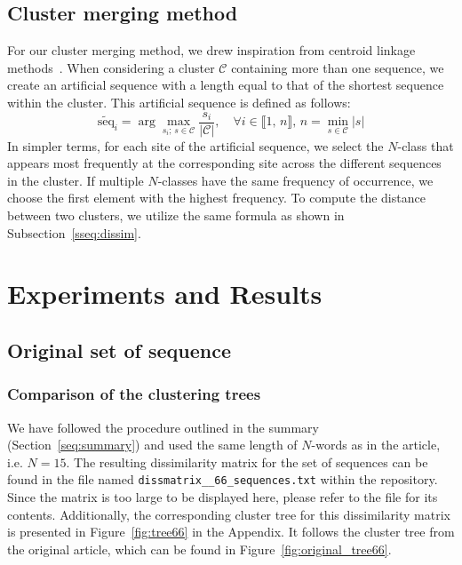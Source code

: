 \documentclass[english,13pt,a4paper]{article}
\theoremstyle{definition}
\theoremstyle{remark}
\theoremstyle{defstyle}
\begin{document}
\subsection{Cluster merging method}\label{ssec:merge}

For our cluster merging method, we drew inspiration from centroid linkage methods~\cite{duda1973pattern}. When considering a cluster $\mathcal{C}$ containing more than one sequence, we create an artificial sequence with a length equal to that of the shortest sequence within the cluster. This artificial sequence is defined as follows:
\[
    \widetilde{\text{seq}}_i = \arg \max_{s_i; \,s \in \mathcal C} \frac{s_i}{|\mathcal C|},  \quad \forall i \in \llbracket 1, \, n \rrbracket, \, n = \min_{s \in \mathcal{C}} |s| 
\]
In simpler terms, for each site of the artificial sequence, we select the $N$-class that appears most frequently at the corresponding site across the different sequences in the cluster. If multiple $N$-classes have the same frequency of occurrence, we choose the first element with the highest frequency. To compute the distance between two clusters, we utilize the same formula as shown in Subsection~\ref{sseq:dissim}. 



\section{Experiments and Results}

\subsection{Original set of sequence}

\subsubsection{Comparison of the clustering trees}

We have followed the procedure outlined in the summary (Section~\ref{seq:summary}) and used the same length of $N$-words as in the article, i.e. $N=15$. The resulting dissimilarity matrix for the set of sequences can be found in the file named \texttt{dissmatrix\_\_66\_sequences.txt} within the repository. Since the matrix is too large to be displayed here, please refer to the file for its contents. Additionally, the corresponding cluster tree for this dissimilarity matrix is presented in Figure~\ref{fig:tree66} in the Appendix. It follows the cluster tree from the original article, which can be found in Figure~\ref{fig:original_tree66}.\\
\end{document}
